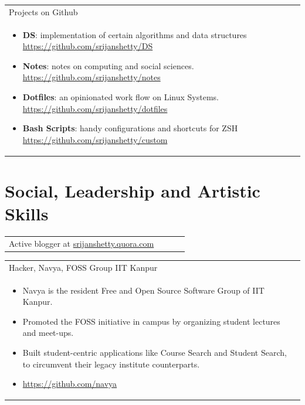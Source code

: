 \documentclass[a4paper,10pt]{article} %
\newcommand{\projectlist}[2]{
    \begin{tabular}{p{\linewidth}}
        \textcolor{NavyBlue}{#1}\\
        \vspace{-0.3cm}
        \footnotesize{#2}
    \end{tabular}
    \vspace{-0.4cm}
}
\newcommand{\skill}[2]{
    \begin{tabular}{p{0.85\linewidth}r}
        #2 & \multicolumn{1}{m{3cm}}{\raggedleft \textsc{#1}}\\
    \end{tabular}
    \vspace{-0.5cm}
}
\begin{document}
\projectlist {Projects on Github}
             {
                 \begin{itemize}[leftmargin=0.5cm]
                     \item \textbf{DS}: implementation of certain algorithms and data structures
                         \href{https://github.com/srijanshetty/DS} {https://github.com/srijanshetty/DS}
                     \item \textbf{Notes}: notes on computing and social sciences.
                         \href{https://github.com/srijanshetty/notes} {https://github.com/srijanshetty/notes}
                     \item \textbf{Dotfiles}: an opinionated work flow on Linux Systems.
                         \href{https://github.com/srijanshetty/dotfiles} {https://github.com/srijanshetty/dotfiles}
                     \item \textbf{Bash Scripts}: handy configurations and shortcuts for ZSH
                         \href{https://github.com/srijanshetty/custom} {https://github.com/srijanshetty/custom}
                 \end{itemize}
             }


\section {Social, Leadership and Artistic Skills}

\skill {}
       {Active blogger at \href{srijanshetty.quora.com} {srijanshetty.quora.com}}

\projectlist {Hacker, Navya, FOSS Group IIT Kanpur}
             {
                   \begin{itemize}[leftmargin=0.5cm]
                       \item Navya is the resident Free and Open Source Software Group of IIT Kanpur.
                       \item Promoted the FOSS initiative in campus by organizing student lectures and meet-ups.
                       \item Built student-centric applications like Course Search and Student Search, to circumvent
                           their legacy institute counterparts.
                       \item \href{https://github.com/navya} {https://github.com/navya}
                   \end{itemize}
             }
\end{document}
